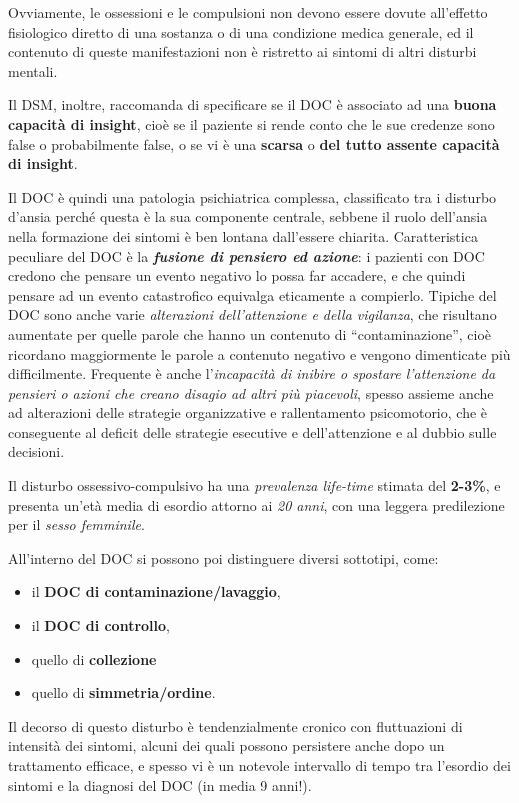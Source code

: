 Ovviamente, le ossessioni e le compulsioni non devono essere dovute
all'effetto fisiologico diretto di una sostanza o di una condizione
medica generale, ed il contenuto di queste manifestazioni non è
ristretto ai sintomi di altri disturbi mentali.

Il DSM, inoltre, raccomanda di specificare se il DOC è associato ad una
\textbf{buona capacità di insight}, cioè se il paziente si rende conto
che le sue credenze sono false o probabilmente false, o se vi è una
\textbf{scarsa} o \textbf{del tutto assente capacità di insight}.

Il DOC è quindi una patologia psichiatrica complessa, classificato tra i
disturbo d'ansia perché questa è la sua componente centrale, sebbene il
ruolo dell'ansia nella formazione dei sintomi è ben lontana dall'essere
chiarita. Caratteristica peculiare del DOC è la \textbf{\emph{fusione di
pensiero ed azione}}: i pazienti con DOC credono che pensare un evento
negativo lo possa far accadere, e che quindi pensare ad un evento
catastrofico equivalga eticamente a compierlo. Tipiche del DOC sono
anche varie \emph{alterazioni dell'attenzione e della vigilanza}, che
risultano aumentate per quelle parole che hanno un contenuto di
``contaminazione'', cioè ricordano maggiormente le parole a contenuto
negativo e vengono dimenticate più difficilmente. Frequente è anche
l'\emph{incapacità di inibire o spostare l'attenzione da pensieri o
azioni che creano disagio ad altri più piacevoli}, spesso assieme anche
ad alterazioni delle strategie organizzative e rallentamento
psicomotorio, che è conseguente al deficit delle strategie esecutive e
dell'attenzione e al dubbio sulle decisioni.

Il disturbo ossessivo-compulsivo ha una \emph{prevalenza life-time}
stimata del \textbf{2-3\%}, e presenta un'età media di esordio attorno
ai \emph{20 anni}, con una leggera predilezione per il \emph{sesso
femminile}.

All'interno del DOC si possono poi distinguere diversi sottotipi, come:

\begin{itemize}
\item
  il \textbf{DOC di contaminazione/lavaggio},
\item
  il \textbf{DOC di controllo},
\item
  quello di \textbf{collezione}
\item
  quello di \textbf{simmetria/ordine}.
\end{itemize}

Il decorso di questo disturbo è tendenzialmente cronico con fluttuazioni
di intensità dei sintomi, alcuni dei quali possono persistere anche dopo
un trattamento efficace, e spesso vi è un notevole intervallo di tempo
tra l'esordio dei sintomi e la diagnosi del DOC (in media 9 anni!).

